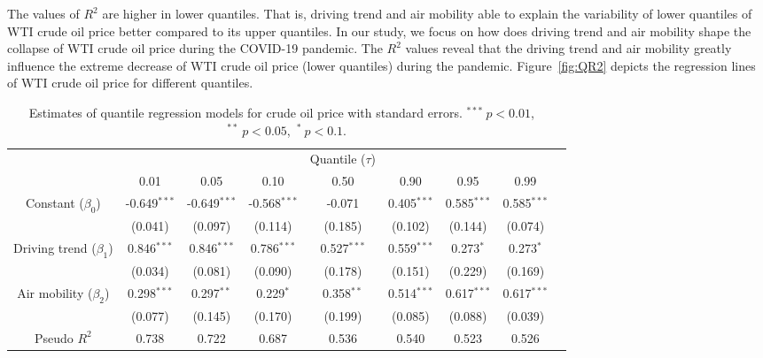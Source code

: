 \documentclass[review]{elsarticle}
\begin{document}
The values of $R^2$ are higher in lower quantiles. That is,  driving trend and air mobility able to explain the variability of lower quantiles of WTI crude oil price better compared to its upper quantiles. In our study, we focus on how does driving trend and air mobility shape the collapse of WTI crude oil price during the COVID-19 pandemic.
The $R^2$ values reveal that the driving trend and air mobility
greatly influence the extreme decrease of WTI crude oil price (lower quantiles) during the pandemic.
Figure~\ref{fig:QR2} depicts the regression lines of WTI crude oil price for different quantiles.



\begin{table*}[!ht]
\caption{Estimates of quantile regression models for crude oil price with standard errors. $^{***}~p<0.01$, ~$^{**}~p<0.05$,~$^{*}~p<0.1$.}
	\label{table:QR_Tab2}
	\centering
	\begin{tabular}{c | *{7}{c} r}  
	\hline
		       &     &   &   & Quantile ($\tau$) &  &  &  \\
       	       & 0.01     & 0.05   &  0.10 & 0.50 & 0.90  & 0.95 & 0.99 \\
	\hline
    Constant ($\beta_0$)  & -0.649$^{***}$ &  -0.649$^{***}$ & -0.568$^{***}$ & -0.071 & 0.405$^{***}$ & 0.585$^{***}$ &  0.585$^{***}$ \\ 
                          &  (0.041)       & (0.097)        &  (0.114)        & (0.185) & (0.102)       & (0.144)       & (0.074) \\ 
		\hline
    Driving trend ($\beta_1$)        & 0.846$^{***}$  &  0.846$^{***}$ &  0.786$^{***}$ &  0.527$^{***}$ & 0.559$^{***}$ &  0.273$^{*}$ &  0.273$^{*}$ \\ 
                                     &  (0.034)      & (0.081)         &  (0.090)       & (0.178)         & (0.151)       & (0.229)     &  (0.169) \\ 
       	\hline
    Air mobility ($\beta_2$)    &  0.298$^{***}$ &  0.297$^{**}$ &  0.229$^{*}$ &  0.358$^{**}$ &  0.514$^{***}$ & 0.617$^{***}$ &   0.617$^{***}$  \\ 
                                &  (0.077)       & (0.145)        & (0.170)      & (0.199) &  (0.085)            &  (0.088)      & (0.039) \\ 
      	\hline 

     
     Pseudo $R^2$  & 0.738 &   0.722 &  0.687 & 0.536 & 0.540 &  0.523 & 0.526 \\  

	 \hline	

    		 \hline	
\end{tabular}
\end{table*}
\end{document}
